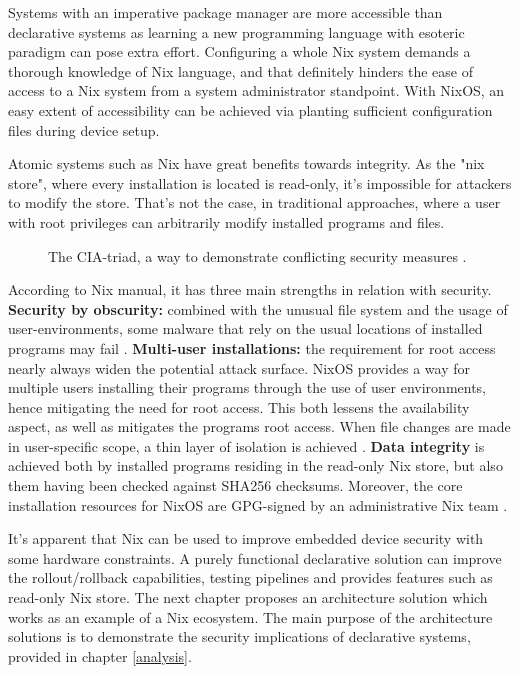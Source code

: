 Systems with an imperative package manager are more accessible than
declarative systems as learning a new programming language with
esoteric paradigm can pose extra effort. Configuring a whole Nix
system demands a thorough knowledge of Nix language, and that
definitely hinders the ease of access to a Nix system from a system
administrator standpoint. With NixOS, an easy extent of accessibility
can be achieved via planting sufficient configuration files during
device setup.

Atomic systems such as Nix have great benefits towards integrity. As
the "nix store", where every installation is located is read-only,
it's impossible for attackers to modify the store. That's not the
case, in traditional approaches, where a user with root privileges can arbitrarily modify installed
programs and files.

\begin{figure}[t!]
\centerline{}
\caption{The CIA-triad, a way to demonstrate conflicting security
  measures \cite{hughes2013quantitative}.}
\label{ciatriad}
\end{figure}

According to Nix manual, it has three main strengths in relation with
security. \textbf{Security by obscurity: }combined with the unusual
file system and the usage of user-environments, some malware that rely
on the usual locations of installed programs may fail
\cite{nixosSecurityNixOS}. \textbf{Multi-user installations: }the
requirement for root access nearly always widen the potential attack
surface. NixOS provides a way for multiple users installing their
programs through the use of user environments, hence mitigating the
need for root access. This both lessens the availability aspect, as
well as mitigates the programs root access. When file changes are made
in user-specific scope, a thin layer of isolation is achieved
\cite{nixosNixOSManual}. \textbf{Data integrity} is achieved both by
installed programs residing in the read-only Nix store, but also them
having been checked against SHA256 checksums. Moreover, the core
installation resources for NixOS are GPG-signed by an administrative
Nix team \cite{nixosSecurityNixOS}.

It's apparent that Nix can be used to improve embedded device security
with some hardware constraints. A purely functional declarative
solution can improve the rollout/rollback capabilities, testing
pipelines and provides features such as read-only Nix store. The next
chapter proposes an architecture solution which works as an example of
a Nix ecosystem. The main purpose of the architecture solutions is to
demonstrate the security implications of declarative systems, provided
in chapter \ref{analysis}. 
